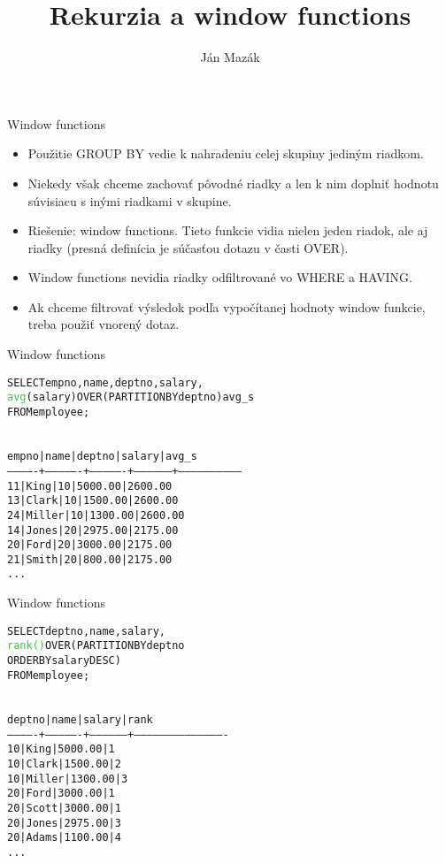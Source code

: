 \documentclass[12pt]{beamer}
\title{Rekurzia a window functions}
\author{Ján Mazák}
\institute{FMFI UK Bratislava}
\date{}
\def\blue#1{\textcolor{Cerulean}{#1}}
\def\green#1{\textcolor{LimeGreen}{#1}}
\begin{document}
\frame{\titlepage}

\begin{frame}[fragile]{Window functions}
\begin{itemize}
\item Použitie GROUP BY vedie k nahradeniu celej skupiny jediným riadkom.
\item Niekedy však chceme zachovať pôvodné riadky a len k nim doplniť hodnotu súvisiacu s inými riadkami v skupine.
\item Riešenie: \alert{window functions}. Tieto funkcie vidia nielen jeden riadok, ale aj  riadky
    (presná definícia je súčasťou dotazu v časti \alert{OVER}).
\item Window functions nevidia riadky odfiltrované vo WHERE a HAVING.
\item Ak chceme filtrovať výsledok podľa vypočítanej hodnoty window funkcie, treba použiť vnorený dotaz.
\end{itemize}
\end{frame}

\begin{frame}[fragile]{Window functions}
\begin{alltt}
SELECT empno, name, deptno, salary,
       \green{avg}(salary) \alert{OVER (PARTITION BY deptno)} avg_s
FROM employee;
\end{alltt}
\begin{alltt}
\blue{
 empno | name   | deptno | salary  | avg_s
-------------+----------------+----------------+------------------+-----------------------------
    11 | King   |     10 | 5000.00 | 2600.00
    13 | Clark  |     10 | 1500.00 | 2600.00
    24 | Miller |     10 | 1300.00 | 2600.00
    14 | Jones  |     20 | 2975.00 | 2175.00
    20 | Ford   |     20 | 3000.00 | 2175.00
    21 | Smith  |     20 |  800.00 | 2175.00
    ...
}
\end{alltt}
\end{frame}

\begin{frame}[fragile]{Window functions}
\begin{alltt}
SELECT deptno, name, salary,
       \green{rank()} \alert{OVER (PARTITION BY deptno
                    ORDER BY salary DESC)}
FROM employee;
\end{alltt}
\begin{alltt}
\blue{
 deptno |  name  | salary  | rank
 -------------+----------------+------------------+-------------------------------------------
     10 | King   | 5000.00 |    1
     10 | Clark  | 1500.00 |    2
     10 | Miller | 1300.00 |    3
     20 | Ford   | 3000.00 |    1
     20 | Scott  | 3000.00 |    1
     20 | Jones  | 2975.00 |    3
     20 | Adams  | 1100.00 |    4
    ...
}
\end{alltt}
\end{frame}
\end{document}
